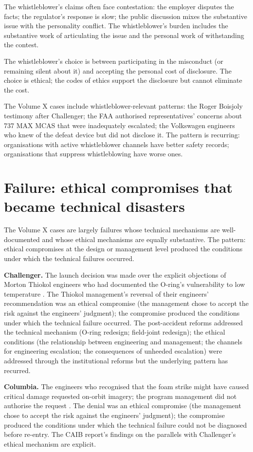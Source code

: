The whistleblower's claims often face contestation: the employer disputes the facts; the regulator's response is slow; the public discussion mixes the substantive issue with the personality conflict. The whistleblower's burden includes the substantive work of articulating the issue and the personal work of withstanding the contest.

The whistleblower's choice is between participating in the misconduct (or remaining silent about it) and accepting the personal cost of disclosure. The choice is ethical; the codes of ethics support the disclosure but cannot eliminate the cost.

The Volume X cases include whistleblower-relevant patterns: the Roger Boisjoly testimony after Challenger; the FAA authorised representatives' concerns about 737 MAX MCAS that were inadequately escalated; the Volkswagen engineers who knew of the defeat device but did not disclose it. The pattern is recurring: organisations with active whistleblower channels have better safety records; organisations that suppress whistleblowing have worse ones.

\section{Failure: ethical compromises that became technical disasters}

The Volume X cases are largely failures whose technical mechanisms are well-documented and whose ethical mechanisms are equally substantive. The pattern: ethical compromises at the design or management level produced the conditions under which the technical failures occurred.

\textbf{Challenger.} The launch decision was made over the explicit objections of Morton Thiokol engineers who had documented the O-ring's vulnerability to low temperature \cite{acc:nasa-challenger}. The Thiokol management's reversal of their engineers' recommendation was an ethical compromise (the management chose to accept the risk against the engineers' judgment); the compromise produced the conditions under which the technical failure occurred. The post-accident reforms addressed the technical mechanism (O-ring redesign; field-joint redesign); the ethical conditions (the relationship between engineering and management; the channels for engineering escalation; the consequences of unheeded escalation) were addressed through the institutional reforms but the underlying pattern has recurred.

\textbf{Columbia.} The engineers who recognised that the foam strike might have caused critical damage requested on-orbit imagery; the program management did not authorise the request \cite{acc:caib-columbia}. The denial was an ethical compromise (the management chose to accept the risk against the engineers' judgment); the compromise produced the conditions under which the technical failure could not be diagnosed before re-entry. The CAIB report's findings on the parallels with Challenger's ethical mechanism are explicit.

